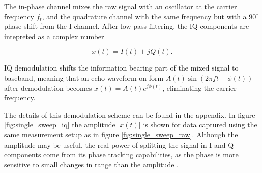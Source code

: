 The in-phase channel mixes the raw signal with an oscillator at the carrier frequency $f_t$, and the quadrature channel with the same frequency but with a $90^\circ$ phase shift from the I channel. After low-pass filtering, the IQ components are intepreted as a complex number

\begin{equation}
	x(t) = I(t) + jQ(t).
\end{equation}

IQ demodulation shifts the information bearing part of the mixed signal to baseband, meaning that an echo waveform on form $A(t)\sin(2\pi f t + \phi(t))$ after demodulation becomes $x(t) = A(t)e^{j\phi(t)}$, eliminating the carrier frequency. 

The details of this demodulation scheme can be found in the appendix. In figure \ref{fig:single_sweep_iq} the amplitude $|x(t)|$ is shown for data captured using the same measurement setup as in figure \ref{fig:single_sweep_raw}. Although the amplitude may be useful, the real power of splitting the signal in I and Q components come from its phase tracking capabilities, as the phase is more sensitive to small changes in range than the amplitude \citep{lien_gillian_karagozler_amihood_schwesig_olson_raja_poupyrev_2016}.





